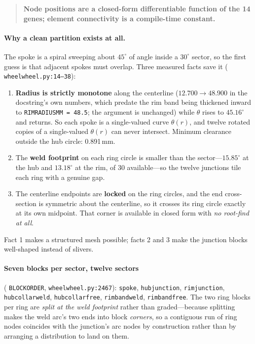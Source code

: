 \documentclass[11pt,a4paper]{article}
\DeclareRobustCommand{\code}[1]{%
  \texttt{\small\def\_{\textunderscore\discretionary{}{}{}}#1}}
\newcommand{\at}[2]{\code{#1:#2}}
\begin{document}
\begin{quote}
\textbf{Node positions are a closed-form differentiable function of the 14 genes;
element connectivity is a compile-time constant.}
\end{quote}

\paragraph{Why a clean partition exists at all.}
The spoke is a spiral sweeping about $45^\circ$ of angle inside a $30^\circ$ sector, so
the first guess is that adjacent spokes must overlap. Three measured facts save it
(\at{wheel\_wheel.py}{14--38}):

\begin{enumerate}
\item \textbf{Radius is strictly monotone} along the centerline
  ($12.700 \to 48.900$ in the docstring's own numbers, which predate the rim band being
  thickened inward to \code{RIM\_RADIUS\_MM = 48.5}; the argument is unchanged) while
  $\theta$ rises to $45.16^\circ$ and returns. So each spoke is a single-valued curve
  $\theta(r)$, and twelve rotated copies of a single-valued $\theta(r)$ can never
  intersect. Minimum clearance outside the hub circle: 0.891\,mm.
\item The \textbf{weld footprint} on each ring circle is smaller than the
  sector---$15.85^\circ$ at the hub and $13.18^\circ$ at the rim, of 30
  available---so the twelve junctions tile each ring with a genuine gap.
\item The centerline endpoints are \textbf{locked} on the ring circles, and the end
  cross-section is symmetric about the centerline, so it crosses its ring circle
  exactly at its own midpoint. That corner is available in closed form with \emph{no
  root-find at all}.
\end{enumerate}

Fact 1 makes a structured mesh possible; facts 2 and 3 make the junction blocks
well-shaped instead of slivers.

\paragraph{Seven blocks per sector, twelve sectors}
(\code{BLOCK\_ORDER}, \at{wheel\_wheel.py}{2467}): \code{spoke},
\code{hub\_junction}, \code{rim\_junction}, \code{hub\_collar\_weld},
\code{hub\_collar\_free}, \code{rim\_band\_weld}, \code{rim\_band\_free}. The two ring
blocks per ring are \emph{split at the weld footprint} rather than graded---because
splitting makes the weld arc's two ends into block \emph{corners}, so a contiguous run
of ring nodes coincides with the junction's arc nodes by construction rather than by
arranging a distribution to land on them.
\end{document}
